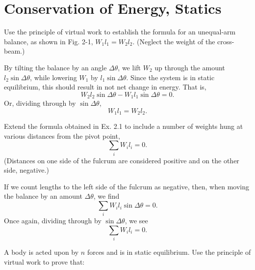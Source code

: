 \documentclass[../feynman-lectures-on-physics.tex]{subfiles}
\begin{document}
\section{Conservation of Energy, Statics}

\begin{questions}

\question Use the principle of virtual work to establish the formula for an unequal-arm balance, as shown in Fig. 2-1, $W_1l_1=W_2l_2$. (Neglect the weight of the cross-beam.)

\begin{solution}
	By tilting the balance by an angle $\Delta\theta$, we lift $W_2$ up through the amount $l_2\sin\Delta\theta$, while lowering $W_1$ by $l_1\sin\Delta\theta$. Since the system is in static equilibrium, this should result in not net change in energy. That is,
	\[
	W_2l_2\sin\Delta\theta - W_1l_1\sin\Delta\theta = 0
	.\] 
	Or, dividing through by $\sin\Delta\theta$,
	\[
	W_1l_1 = W_2l_2
	.\] 
\end{solution}

\question Extend the formula obtained in Ex. 2.1 to include a number of weights hung at various distances from the pivot point,
\[
\sum_iW_il_i = 0
.\] 
(Distances on one side of the fulcrum are considered positive and on the other side, negative.)

\begin{solution}
	If we count lengths to the left side of the fulcrum as negative, then, when moving the balance by an amount $\Delta\theta$, we find
	\[
	\sum_iW_il_i\sin\Delta\theta = 0
	.\] 
	Once again, dividing through by $\sin\Delta\theta$, we see
	\[
	\sum_iW_il_i = 0
	.\] 
\end{solution}

\question A body is acted upon by $n$ forces and is in static equilibrium. Use the principle of virtual work to prove that:
\end{questions}
\end{document}

